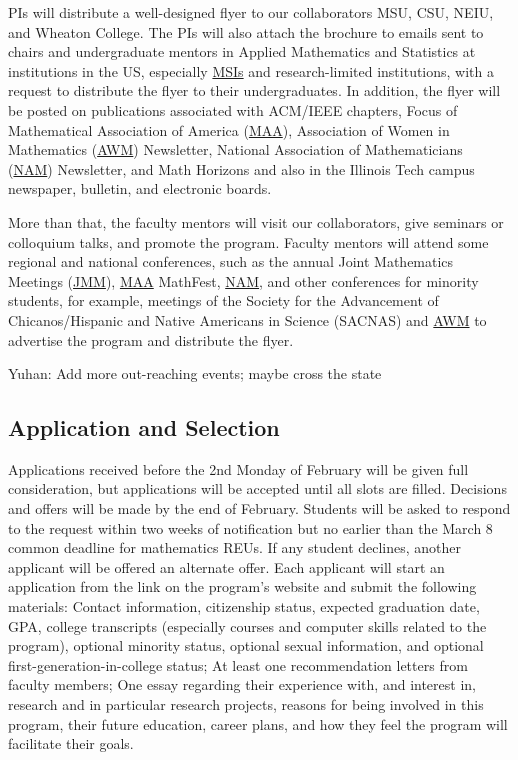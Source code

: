 \documentclass[11pt]{NSFamsart}
\newcommand{\MAA}{\hyperlink{MAAlink}{MAA}\xspace}
\newcommand{\JMM}{\hyperlink{JMMlink}{JMM}\xspace}
\newcommand{\AWM}{\hyperlink{AWMlink}{AWM}\xspace}
\newcommand{\NAM}{\hyperlink{NAMlink}{NAM}\xspace}
\newcommand{\MSIs}{\hyperlink{MSIlink}{MSIs}\xspace}
\newcommand{\YDNote}[1]{{\color{magenta}Yuhan: #1}}
\begin{document}
PIs will distribute a well-designed flyer to our collaborators MSU, CSU, NEIU,  and Wheaton College.
The PIs will also attach the brochure to emails sent to
chairs and undergraduate mentors in Applied Mathematics and Statistics at institutions in the US, especially
\MSIs and research-limited institutions, with a request to distribute the flyer to their undergraduates. 
In addition, the flyer
will be posted on publications associated with ACM/IEEE chapters, Focus of \hypertarget{MAAlink}{Mathematical Association of America} (\MAA), \hypertarget{AWMlink}{Association of Women in Mathematics} (\AWM)
Newsletter, \hypertarget{NAMlink}{ National Association of Mathematicians} (\NAM) Newsletter, and Math Horizons and also in the Illinois Tech campus newspaper, bulletin, and electronic boards.

More than that, the faculty mentors will visit our collaborators, give seminars or colloquium talks, and promote the program. 
Faculty mentors will attend some regional and national conferences, such as
the annual  \hypertarget{JMMlink}{Joint Mathematics Meetings} (\JMM), \MAA MathFest, \NAM, and other conferences for minority students, for example, meetings of the Society for the Advancement of Chicanos/Hispanic and Native Americans in Science  (SACNAS) and 
\AWM  to advertise the program and distribute the flyer. 

\YDNote{Add more out-reaching events; maybe cross the state}

\subsection{Application and Selection} 
Applications received before the 2nd Monday of February will be given full consideration, but applications will be accepted until all slots are filled. Decisions and offers will be made by the end of February. Students will be asked to respond to the request within two weeks of notification but no earlier than the March 8 common deadline for mathematics REUs. If any student declines, another applicant will be offered an alternate offer. 
Each applicant will start an application from the link on the program’s
website and submit the following materials: 
Contact information, citizenship status, expected graduation date, GPA, college transcripts (especially courses and computer skills related to the program),
optional minority status, optional sexual information, and optional first-generation-in-college status;
At least one recommendation
letters from faculty members; 
One essay regarding their experience with, and interest in, research and in particular research projects, reasons for being involved in this program, their future
education, career plans, and how they feel the program will facilitate their goals. 
\end{document}
